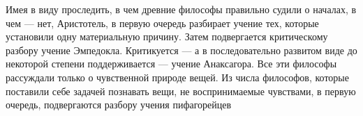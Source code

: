 \documentclass{article}
\begin{document}
Имея в виду проследить, в чем древние философы правильно судили о началах, в чем — нет, Аристотель, в первую очередь разбирает учение тех, которые установили одну материальную причину. Затем подвергается критическому разбору учение Эмпедокла. Критикуется — а в последовательно развитом виде до некоторой степени поддерживается — учение Анаксагора. Все эти философы рассуждали только о чувственной природе вещей. Из числа философов, которые поставили себе задачей познавать вещи, не воспринимаемые чувствами, в первую очередь, подвергаются разбору учения пифагорейцев
\end{document}
